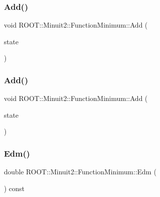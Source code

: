 \subsubsection{\texorpdfstring{Add()}{Add()}\hspace{0.1cm}{\footnotesize\ttfamily [1/2]}}
{\footnotesize\ttfamily void R\+O\+O\+T\+::\+Minuit2\+::\+Function\+Minimum\+::\+Add (\begin{DoxyParamCaption}\item[{const \mbox{\hyperlink{classROOT_1_1Minuit2_1_1MinimumState}{Minimum\+State}} \&}]{state }\end{DoxyParamCaption})\hspace{0.3cm}{\ttfamily [inline]}}

\mbox{\label{classROOT_1_1Minuit2_1_1FunctionMinimum_a13b69e2d431d568f4485eb8b79d6c781}} 
\subsubsection{\texorpdfstring{Add()}{Add()}\hspace{0.1cm}{\footnotesize\ttfamily [2/2]}}
{\footnotesize\ttfamily void R\+O\+O\+T\+::\+Minuit2\+::\+Function\+Minimum\+::\+Add (\begin{DoxyParamCaption}\item[{const \mbox{\hyperlink{classROOT_1_1Minuit2_1_1MinimumState}{Minimum\+State}} \&}]{state }\end{DoxyParamCaption})\hspace{0.3cm}{\ttfamily [inline]}}

\mbox{\label{classROOT_1_1Minuit2_1_1FunctionMinimum_aef90d7ca242a7ea211d56b188679f4b9}} 
\subsubsection{\texorpdfstring{Edm()}{Edm()}\hspace{0.1cm}{\footnotesize\ttfamily [1/2]}}
{\footnotesize\ttfamily double R\+O\+O\+T\+::\+Minuit2\+::\+Function\+Minimum\+::\+Edm (\begin{DoxyParamCaption}{ }\end{DoxyParamCaption}) const\hspace{0.3cm}{\ttfamily [inline]}}


